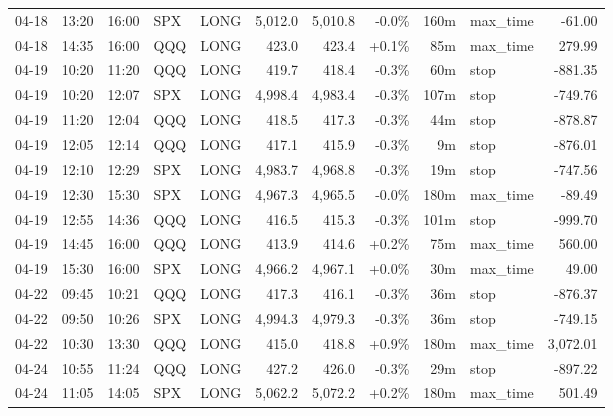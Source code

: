 \documentclass[11pt,a4paper,twoside]{article}
\begin{document}
\begin{center}
\begin{longtable}{>{\color{txtmain}}l l l l l r r r r >{\color{txtmain}}l r}
04-18 & 13:20 & 16:00 & SPX & LONG & 5,012.0 & 5,010.8 & \textcolor{lossred}{-0.0\%} & 160m & max\_time & \textcolor{lossred}{-61.00} \\
04-18 & 14:35 & 16:00 & QQQ & LONG & 423.0 & 423.4 & \textcolor{wingreen}{+0.1\%} & 85m & max\_time & \textcolor{wingreen}{279.99} \\
04-19 & 10:20 & 11:20 & QQQ & LONG & 419.7 & 418.4 & \textcolor{lossred}{-0.3\%} & 60m & stop & \textcolor{lossred}{-881.35} \\
04-19 & 10:20 & 12:07 & SPX & LONG & 4,998.4 & 4,983.4 & \textcolor{lossred}{-0.3\%} & 107m & stop & \textcolor{lossred}{-749.76} \\
04-19 & 11:20 & 12:04 & QQQ & LONG & 418.5 & 417.3 & \textcolor{lossred}{-0.3\%} & 44m & stop & \textcolor{lossred}{-878.87} \\
04-19 & 12:05 & 12:14 & QQQ & LONG & 417.1 & 415.9 & \textcolor{lossred}{-0.3\%} & 9m & stop & \textcolor{lossred}{-876.01} \\
04-19 & 12:10 & 12:29 & SPX & LONG & 4,983.7 & 4,968.8 & \textcolor{lossred}{-0.3\%} & 19m & stop & \textcolor{lossred}{-747.56} \\
04-19 & 12:30 & 15:30 & SPX & LONG & 4,967.3 & 4,965.5 & \textcolor{lossred}{-0.0\%} & 180m & max\_time & \textcolor{lossred}{-89.49} \\
04-19 & 12:55 & 14:36 & QQQ & LONG & 416.5 & 415.3 & \textcolor{lossred}{-0.3\%} & 101m & stop & \textcolor{lossred}{-999.70} \\
04-19 & 14:45 & 16:00 & QQQ & LONG & 413.9 & 414.6 & \textcolor{wingreen}{+0.2\%} & 75m & max\_time & \textcolor{wingreen}{560.00} \\
04-19 & 15:30 & 16:00 & SPX & LONG & 4,966.2 & 4,967.1 & \textcolor{wingreen}{+0.0\%} & 30m & max\_time & \textcolor{wingreen}{49.00} \\
04-22 & 09:45 & 10:21 & QQQ & LONG & 417.3 & 416.1 & \textcolor{lossred}{-0.3\%} & 36m & stop & \textcolor{lossred}{-876.37} \\
04-22 & 09:50 & 10:26 & SPX & LONG & 4,994.3 & 4,979.3 & \textcolor{lossred}{-0.3\%} & 36m & stop & \textcolor{lossred}{-749.15} \\
04-22 & 10:30 & 13:30 & QQQ & LONG & 415.0 & 418.8 & \textcolor{wingreen}{+0.9\%} & 180m & max\_time & \textcolor{wingreen}{3,072.01} \\
04-24 & 10:55 & 11:24 & QQQ & LONG & 427.2 & 426.0 & \textcolor{lossred}{-0.3\%} & 29m & stop & \textcolor{lossred}{-897.22} \\
04-24 & 11:05 & 14:05 & SPX & LONG & 5,062.2 & 5,072.2 & \textcolor{wingreen}{+0.2\%} & 180m & max\_time & \textcolor{wingreen}{501.49} \\

\end{longtable}
\end{center}
\end{document}
